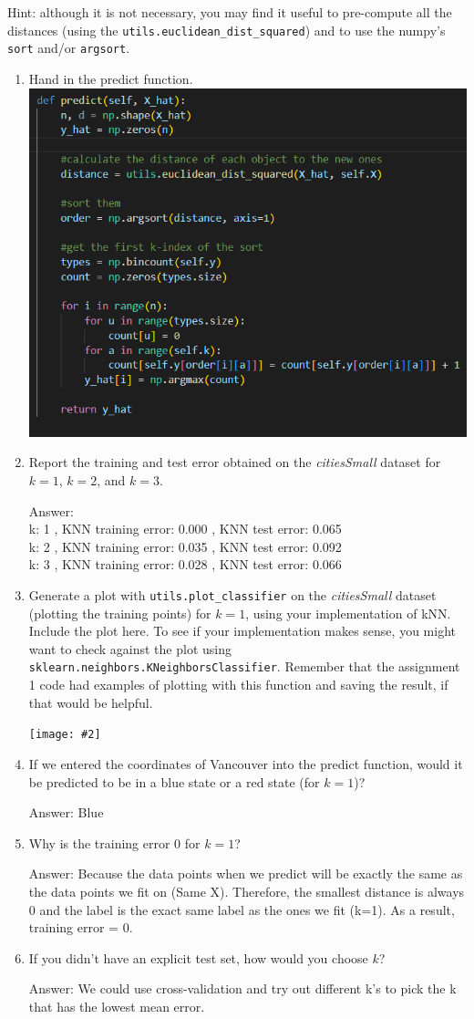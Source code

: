 \documentclass{article}
\def\ans#1{\par\gre{Answer: #1}}
\def\blu#1{{\color{blu}#1}}
\def\gre#1{{\color{gre}#1}}
\let\ask\blu
\newcommand{\centerfig}[2]{\begin{center}\texttt{[image: \#2]}\end{center}}
\def\enum#1{\begin{enumerate}#1\end{enumerate}}
\begin{document}
Hint: although it is not necessary, you may find it useful to pre-compute all the distances (using the \texttt{utils.euclidean\string_dist\string_squared}) and to use the numpy's \texttt{sort} and/or \texttt{argsort}.
\blu{
\enum{
\item Hand in the predict function.
\\
\includegraphics[width=400pt]{2.1.png}
 \\
\item Report  the training and test error obtained on the \emph{citiesSmall} dataset for $k=1$, $k=2$, and $k=3$.
\ans{\\
k:  1
, KNN training error: 0.000
, KNN test error: 0.065
\\
k:  2
, KNN training error: 0.035
, KNN test error: 0.092
\\
k:  3
, KNN training error: 0.028
, KNN test error: 0.066
}
\item Generate a plot with \texttt{utils.plot\_classifier} on the \emph{citiesSmall} dataset (plotting the training points) for $k=1$, using your implementation of kNN. \ask{Include the plot here.} To see if your implementation makes sense, you might want to check against the plot using \texttt{sklearn.neighbors.KNeighborsClassifier}. Remember that the assignment 1 code had examples of plotting with this function and saving the result, if that would be helpful.
\centerfig{.5}{figs/q2.1_knn}
\item If we entered the coordinates of Vancouver into the predict function, would it be predicted to be in a blue state or a red state (for $k=1$)?
\ans{Blue}
\item Why is the training error $0$ for $k=1$?
\ans{Because the data points when we predict will be exactly the same as the data points we fit on (Same X). Therefore, the smallest distance is always 0 and the label is the exact same label as the ones we fit (k=1). As a result, training error = 0.
}
\item If you didn't have an explicit test set, how would you choose $k$?
\ans{We could use cross-validation and try out different k's to pick the k that has the lowest mean error.}
}}
\end{document}
